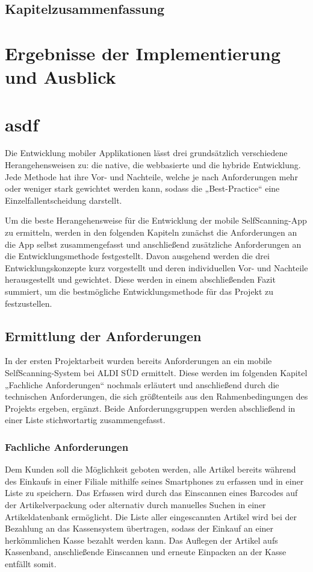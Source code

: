 \section{Kapitelzusammenfassung}

\chapter{Ergebnisse der Implementierung und Ausblick}



\chapter{asdf}
Die Entwicklung mobiler Applikationen lässt drei grundsätzlich verschiedene Herangehensweisen zu: die native, die webbasierte und die hybride Entwicklung. Jede Methode hat ihre Vor- und Nachteile, welche je nach Anforderungen mehr oder weniger stark gewichtet werden kann, sodass die „Best-Practice“ eine Einzelfallentscheidung darstellt.

Um die beste Herangehensweise für die Entwicklung der mobile SelfScanning-App zu ermitteln, werden in den folgenden Kapiteln zunächst die Anforderungen an die App selbst zusammengefasst und anschließend zusätzliche Anforderungen an die Entwicklungsmethode festgestellt. Davon ausgehend werden die drei Entwicklungskonzepte kurz vorgestellt und deren individuellen Vor- und Nachteile herausgestellt und gewichtet. Diese werden in einem abschließenden Fazit summiert, um die bestmögliche Entwicklungsmethode für das Projekt zu festzustellen.

\section{Ermittlung der Anforderungen}
In der ersten Projektarbeit wurden bereits Anforderungen an ein mobile SelfScanning-System bei ALDI SÜD ermittelt. Diese werden im folgenden Kapitel „Fachliche Anforderungen“ nochmals erläutert und anschließend durch die technischen Anforderungen, die sich größtenteils aus den Rahmenbedingungen des Projekts ergeben, ergänzt. Beide Anforderungsgruppen werden abschließend in einer Liste stichwortartig zusammengefasst.

\subsection{Fachliche Anforderungen}
Dem Kunden soll die Möglichkeit geboten werden, alle Artikel bereits während des Einkaufs in einer Filiale mithilfe seines Smartphones zu erfassen und in einer Liste zu speichern. Das Erfassen wird durch das Einscannen eines Barcodes auf der Artikelverpackung oder alternativ durch manuelles Suchen in einer Artikeldatenbank ermöglicht. Die Liste aller eingescannten Artikel wird bei der Bezahlung an das Kassensystem übertragen, sodass der Einkauf an einer herkömmlichen Kasse bezahlt werden kann. Das Auflegen der Artikel aufs Kassenband, anschließende Einscannen und erneute Einpacken an der Kasse entfällt somit.

